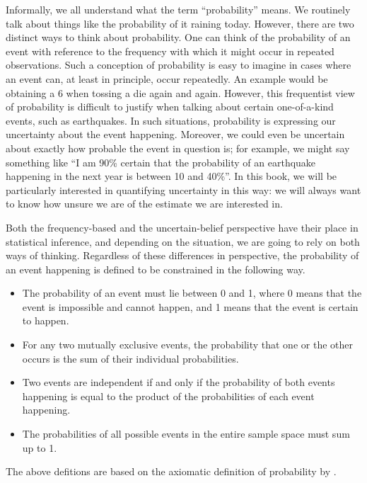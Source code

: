 \documentclass[12pt,]{krantz}
\providecommand{\tightlist}{%
  \setlength{\itemsep}{0pt}\setlength{\parskip}{0pt}}
\begin{document}
Informally, we all understand what the term ``probability'' means. We routinely talk about things like the probability of it raining today. However, there are two distinct ways to think about probability. One can think of the probability of an event with reference to the frequency with which it might occur in repeated observations. Such a conception of probability is easy to imagine in cases where an event can, at least in principle, occur repeatedly. An example would be obtaining a 6 when tossing a die again and again. However, this frequentist view of probability is difficult to justify when talking about certain one-of-a-kind events, such as earthquakes. In such situations, probability is expressing our uncertainty about the event happening. Moreover, we could even be uncertain about exactly how probable the event in question is; for example, we might say something like ``I am 90\% certain that the probability of an earthquake happening in the next year is between 10 and 40\%''. In this book, we will be particularly interested in quantifying uncertainty in this way: we will always want to know how unsure we are of the estimate we are interested in.

Both the frequency-based and the uncertain-belief perspective have their place in statistical inference, and depending on the situation, we are going to rely on both ways of thinking. Regardless of these differences in perspective, the probability of an event happening is defined to be constrained in the following way.

\begin{itemize}
\tightlist
\item
  The probability of an event must lie between 0 and 1, where 0 means that the event is impossible and cannot happen, and 1 means that the event is certain to happen.
\item
  For any two mutually exclusive events, the probability that one or the other occurs is the sum of their individual probabilities.
\item
  Two events are independent if and only if the probability of both events happening is equal to the product of the probabilities of each event happening.
\item
  The probabilities of all possible events in the entire sample space must sum up to 1.
\end{itemize}

The above defitions are based on the axiomatic definition of probability by \citet{kolmogorov2018foundations}.
\end{document}
